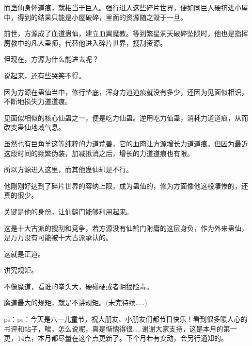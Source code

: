 \begin{this_body}
而蛊仙身怀道痕，就相当于巨人。强行进入这些碎片世界，便如同巨人硬挤进小屋中，得到的结果只能是小屋破碎，里面的资源随之毁于一旦。

前世，方源成了血道蛊仙，建立血翼魔教。等到繁星洞天破碎坠陨时，他也是指挥魔教中的凡人蛊师，代替他进入碎片世界，搜刮资源。

但现在，方源为什么能进去呢？

说起来，还有些哭笑不得。

因为方源在蛊仙当中，修行垫底，浑身力道道痕就没有多少，还因为见面似相识，不断地损失力道道痕。

见面似相似的核心仙蛊之一，便是吃力仙蛊。逆用吃力仙蛊，消耗力道道痕，从而改变蛊仙地域气息。

虽然也有巨角羊这等纯粹的力道荒兽，它的血肉让方源增长力道道痕。但因为最近这段时间的频繁伪装，加减抵消之后，增长的力道道痕也有限。

所以方源进入这里，而其他蛊仙却是不行。

他刚刚好达到了碎片世界的容纳上限，成为蛊仙的，修为方面像他这般凄惨的，还真的很少。

关键是他的身份，让仙鹤门能够利用起来。

这是十大古派的搜刮和竞争，若方源没有仙鹤门附庸的这层身负，作为外来蛊仙，是万万没有可能被十大古派承认的。

这就是正道。

讲究规矩。

不像魔道，看谁的拳头大，硬碰硬或者阴狠险毒。

魔道最大的规矩，就是不讲规矩。(未完待续……)

ps：ps：今天是六一儿童节，祝大朋友、小朋友们都节日快乐！看到很多暖人心的书评和帖子，唉，怎么说呢，真是惭愧得很……谢谢大家支持，这是本月的第一更，14点，本月都尽量在这个点更新了。下个月若有变动，会另行通知的。

\end{this_body}

